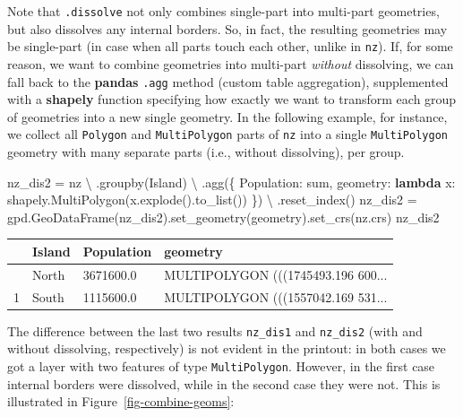 \documentclass[
  letterpaper,
]{krantz}
\newenvironment{Shaded}{\begin{snugshade}}{\end{snugshade}}
\newcommand{\KeywordTok}[1]{\textcolor[rgb]{0.00,0.23,0.31}{\textbf{#1}}}
\newcommand{\NormalTok}[1]{\textcolor[rgb]{0.00,0.23,0.31}{#1}}
\newcommand{\OperatorTok}[1]{\textcolor[rgb]{0.37,0.37,0.37}{#1}}
\newcommand{\StringTok}[1]{\textcolor[rgb]{0.13,0.47,0.30}{#1}}
\begin{document}
Note that \texttt{.dissolve} not only combines single-part into
multi-part geometries, but also dissolves any internal borders. So, in
fact, the resulting geometries may be single-part (in case when all
parts touch each other, unlike in \texttt{nz}). If, for some reason, we
want to combine geometries into multi-part \emph{without} dissolving, we
can fall back to the \textbf{pandas} \texttt{.agg} method (custom table
aggregation), supplemented with a \textbf{shapely} function specifying
how exactly we want to transform each group of geometries into a new
single geometry. In the following example, for instance, we collect all
\texttt{\textquotesingle{}Polygon\textquotesingle{}} and
\texttt{\textquotesingle{}MultiPolygon\textquotesingle{}} parts of
\texttt{nz} into a single
\texttt{\textquotesingle{}MultiPolygon\textquotesingle{}} geometry with
many separate parts (i.e., without dissolving), per group.

\begin{Shaded}
\begin{Highlighting}[]
\NormalTok{nz\_dis2 }\OperatorTok{=}\NormalTok{ nz }\OperatorTok{\textbackslash{}}
\NormalTok{    .groupby(}\StringTok{\textquotesingle{}Island\textquotesingle{}}\NormalTok{) }\OperatorTok{\textbackslash{}}
\NormalTok{    .agg(\{}
        \StringTok{\textquotesingle{}Population\textquotesingle{}}\NormalTok{: }\StringTok{\textquotesingle{}sum\textquotesingle{}}\NormalTok{,}
        \StringTok{\textquotesingle{}geometry\textquotesingle{}}\NormalTok{: }\KeywordTok{lambda}\NormalTok{ x: shapely.MultiPolygon(x.explode().to\_list())}
\NormalTok{    \}) }\OperatorTok{\textbackslash{}}
\NormalTok{    .reset\_index()}
\NormalTok{nz\_dis2 }\OperatorTok{=}\NormalTok{ gpd.GeoDataFrame(nz\_dis2).set\_geometry(}\StringTok{\textquotesingle{}geometry\textquotesingle{}}\NormalTok{).set\_crs(nz.crs)}
\NormalTok{nz\_dis2}
\end{Highlighting}
\end{Shaded}

\begin{longtable}[]{@{}llll@{}}
\toprule\noalign{}
& Island & Population & geometry \\
\midrule\noalign{}
\endhead
\bottomrule\noalign{}
\endlastfoot
0 & North & 3671600.0 & MULTIPOLYGON (((1745493.196 600... \\
1 & South & 1115600.0 & MULTIPOLYGON (((1557042.169 531... \\
\end{longtable}

The difference between the last two results \texttt{nz\_dis1} and
\texttt{nz\_dis2} (with and without dissolving, respectively) is not
evident in the printout: in both cases we got a layer with two features
of type \texttt{\textquotesingle{}MultiPolygon\textquotesingle{}}.
However, in the first case internal borders were dissolved, while in the
second case they were not. This is illustrated in
Figure~\ref{fig-combine-geoms}:
\end{document}
